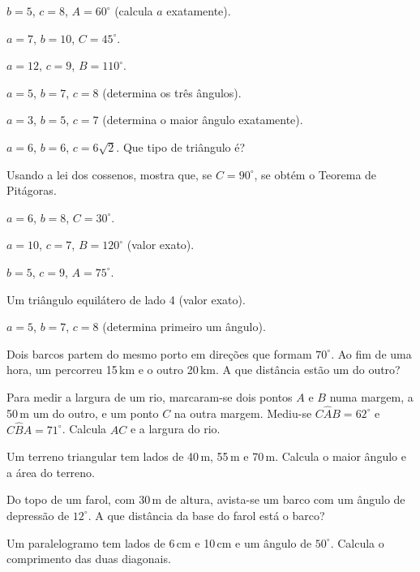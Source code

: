 \documentclass[12pt]{article}
\begin{document}
\begin{exercicios}
  \item $b = 5$, $c = 8$, $A = 60^\circ$ (calcula $a$ exatamente).
  \item $a = 7$, $b = 10$, $C = 45^\circ$.
  \item $a = 12$, $c = 9$, $B = 110^\circ$.
  \item $a = 5$, $b = 7$, $c = 8$ (determina os três ângulos).
  \item $a = 3$, $b = 5$, $c = 7$ (determina o maior ângulo exatamente).
  \item $a = 6$, $b = 6$, $c = 6\sqrt{2}$. Que tipo de triângulo é?
  \item Usando a lei dos cossenos, mostra que, se $C = 90^\circ$, se obtém o Teorema de Pitágoras.
\end{exercicios}

\begin{exercicios}
  \item $a = 6$, $b = 8$, $C = 30^\circ$.
  \item $a = 10$, $c = 7$, $B = 120^\circ$ (valor exato).
  \item $b = 5$, $c = 9$, $A = 75^\circ$.
  \item Um triângulo equilátero de lado 4 (valor exato).
  \item $a = 5$, $b = 7$, $c = 8$ (determina primeiro um ângulo).
\end{exercicios}

\begin{exercicios}
  \item Dois barcos partem do mesmo porto em direções que formam $70^\circ$. Ao fim de uma hora, um percorreu 15\,km e o outro 20\,km. A que distância estão um do outro?
  \item Para medir a largura de um rio, marcaram-se dois pontos $A$ e $B$ numa margem, a 50\,m um do outro, e um ponto $C$ na outra margem. Mediu-se $C\hat{A}B = 62^\circ$ e $C\hat{B}A = 71^\circ$. Calcula $AC$ e a largura do rio.
  \item Um terreno triangular tem lados de 40\,m, 55\,m e 70\,m. Calcula o maior ângulo e a área do terreno.
  \item Do topo de um farol, com 30\,m de altura, avista-se um barco com um ângulo de depressão de $12^\circ$. A que distância da base do farol está o barco?
  \item Um paralelogramo tem lados de 6\,cm e 10\,cm e um ângulo de $50^\circ$. Calcula o comprimento das duas diagonais.
\end{exercicios}
\end{document}
